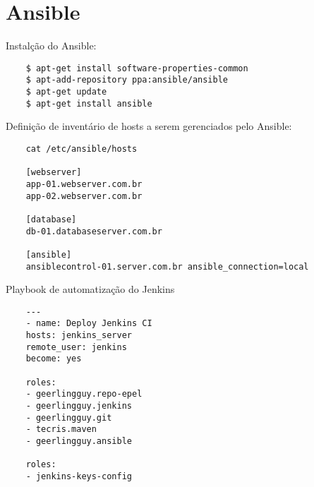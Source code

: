 \section{Ansible}


Instalção do Ansible:
\begin{verbatim}
	$ apt-get install software-properties-common
	$ apt-add-repository ppa:ansible/ansible
	$ apt-get update
	$ apt-get install ansible
\end{verbatim}

Definição de inventário de hosts a serem gerenciados pelo Ansible:
\begin{verbatim}
	cat /etc/ansible/hosts
	
	[webserver]
	app-01.webserver.com.br
	app-02.webserver.com.br
	
	[database]
	db-01.databaseserver.com.br
	
	[ansible]
	ansiblecontrol-01.server.com.br ansible_connection=local
\end{verbatim}

Playbook de automatização do Jenkins
\begin{verbatim}
	---
	- name: Deploy Jenkins CI
	hosts: jenkins_server
	remote_user: jenkins
	become: yes
	
	roles:
	- geerlingguy.repo-epel
	- geerlingguy.jenkins
	- geerlingguy.git
	- tecris.maven
	- geerlingguy.ansible
	
	roles:
	- jenkins-keys-config
\end{verbatim}